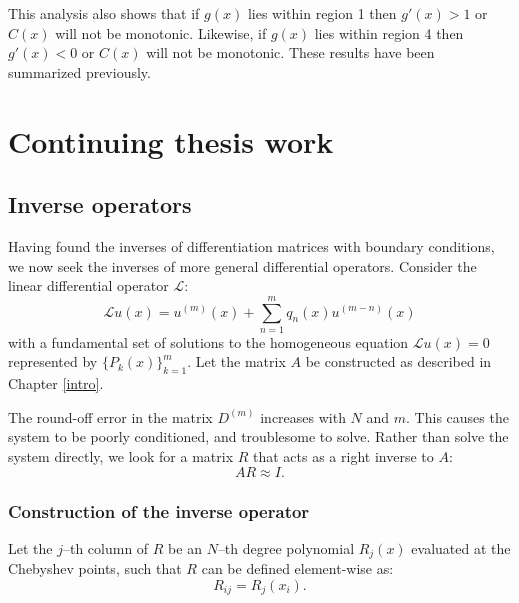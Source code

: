 \documentclass{book}
\begin{document}
This analysis also shows that if $g(x)$ lies within region 1 then $g'(x) > 1$ or $C(x)$ will not be monotonic.
Likewise, if $g(x)$ lies within region 4 then $g'(x) < 0$ or $C(x)$ will not be monotonic.
These results have been summarized previously.

\chapter{Continuing thesis work}

\newcommand{\W}[2]{W \left ( #1 ; #2 \right )}
\newcommand{\poly}[1]{\frac{x^{#1}}{(#1)!}}
\newcommand{\Poly}[1]{\frac{x^#1}{#1!}}

\section{Inverse operators}

Having found the inverses of differentiation matrices with boundary conditions, we now seek the inverses of more general differential operators.
Consider the linear differential operator $\mathcal{L}$:
\begin{equation}
\mathcal{L} u(x) = u^{(m)}(x) + \sum_{n = 1}^m q_n(x) u^{(m-n)}(x)
\end{equation}
with a fundamental set of solutions to the homogeneous equation $\mathcal{L} u(x) = 0$ represented by $\{ P_k(x) \}_{k=1}^m$.
Let the matrix $A$ be constructed as described in Chapter \ref{intro}.

The round-off error in the matrix $D^{(m)}$ increases with $N$ and $m$.
This causes the system to be poorly conditioned, and troublesome to solve.
Rather than solve the system directly, we look for a matrix $R$ that acts as a right inverse to $A$:
\begin{equation}
A R \approx I.
\end{equation}

\subsection{Construction of the inverse operator}

Let the $j$--th column of $R$ be an $N$--th degree polynomial $R_j(x)$ evaluated at the Chebyshev points, such that $R$ can be defined element-wise as:
\begin{equation}
R_{ij} = R_j(x_i) .
\end{equation}
\end{document}
